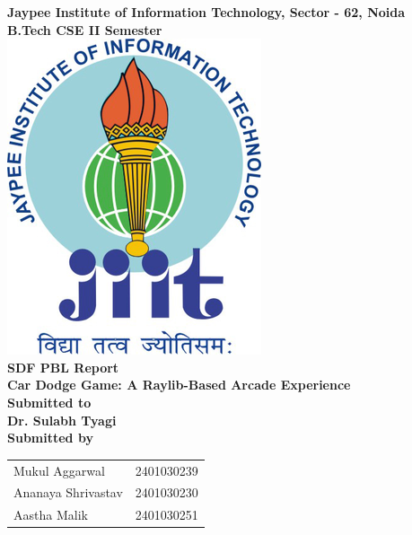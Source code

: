 \documentclass[12pt,a4paper]{article}
\begin{document}
\begin{titlepage}
    \centering
    \Huge
    \textbf{Jaypee Institute of Information Technology, Sector - 62, Noida} \\
    \vspace{0.5cm}
    \Large
    \textbf{B.Tech CSE II Semester} \\
    \vspace{1cm}
    \vspace*{\fill}
    \includegraphics[scale=3]{jiit_logo} \\
    \vspace{1.5cm}
    \Huge
    \textbf{SDF PBL Report} \\
    \Large
    \textbf{Car Dodge Game: A Raylib-Based Arcade Experience} \\
    \vspace{1cm}
    \Large
    \textbf{Submitted to} \\
    \textbf{Dr. Sulabh Tyagi} \\
    \vspace{1cm}
    \textbf{Submitted by} \\
    \vspace{0.5cm}
    \begin{tabular}{ll}
        Mukul Aggarwal & 2401030239 \\
        Ananaya Shrivastav & 2401030230 \\
        Aastha Malik & 2401030251 \\
    \end{tabular}
    \vspace*{\fill}
    \normalsize
\end{titlepage}
\end{document}
